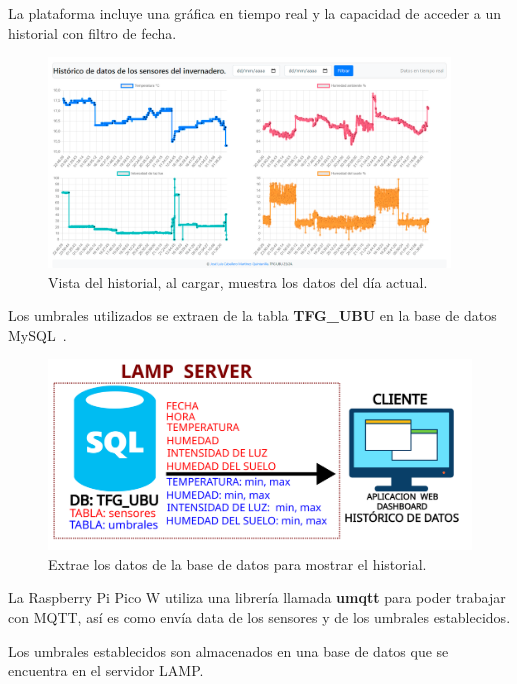 La plataforma incluye una gráfica en tiempo real y la capacidad de acceder a un historial con filtro de fecha.

\begin{figure}[h]
    \centering
    \includegraphics[width=0.95\textwidth]{img/desarrollo/Dashboard_Historico.png}
    \caption{Vista del historial, al cargar, muestra los datos del día actual.} \label{Img:Dashboard_Historico}
\end{figure}

Los umbrales utilizados se extraen de la tabla \textbf{TFG\_UBU} en la base de datos MySQL~\cite{misc:Mysql}.

\begin{figure}[h]
    \centering
    \includegraphics[width=1\textwidth]{img/diagramas/mqtt_dashboard_Historico.png}
    \caption{Extrae los datos de la base de datos para mostrar el historial.} \label{Img:Dashboard_diagrama_Historico}
\end{figure}

La Raspberry Pi Pico W utiliza una librería llamada \textbf{umqtt} para poder trabajar con MQTT, así es como envía data de los sensores y de los umbrales establecidos.

Los umbrales establecidos son almacenados en una base de datos que se encuentra en el servidor LAMP.

